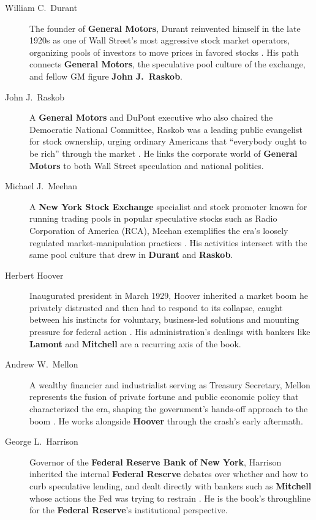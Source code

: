 \documentclass[11pt]{article}
\newcommand{\charname}[1]{\textbf{#1}}
\begin{document}
\begin{description}
\item[William C.\ Durant] The founder of \charname{General Motors}, Durant
reinvented himself in the late 1920s as one of Wall Street's most aggressive
stock market operators, organizing pools of investors to move prices in
favored stocks \autocite{supersummary1929}. His path connects
\charname{General Motors}, the speculative pool culture of the exchange, and
fellow GM figure \charname{John J.\ Raskob}.

\item[John J.\ Raskob] A \charname{General Motors} and DuPont executive who
also chaired the Democratic National Committee, Raskob was a leading public
evangelist for stock ownership, urging ordinary Americans that ``everybody
ought to be rich'' through the market \autocite{supersummary1929,
littlerbooks1929}. He links the corporate world of \charname{General Motors}
to both Wall Street speculation and national politics.

\item[Michael J.\ Meehan] A \charname{New York Stock Exchange} specialist and
stock promoter known for running trading pools in popular speculative stocks
such as Radio Corporation of America (RCA), Meehan exemplifies the era's
loosely regulated market-manipulation practices \autocite{supersummary1929}.
His activities intersect with the same pool culture that drew in
\charname{Durant} and \charname{Raskob}.

\item[Herbert Hoover] Inaugurated president in March 1929, Hoover inherited a
market boom he privately distrusted and then had to respond to its collapse,
caught between his instincts for voluntary, business-led solutions and mounting
pressure for federal action \autocite{supersummary1929,csmonitor1929}. His
administration's dealings with bankers like \charname{Lamont} and
\charname{Mitchell} are a recurring axis of the book.

\item[Andrew W.\ Mellon] A wealthy financier and industrialist serving as
Treasury Secretary, Mellon represents the fusion of private fortune and public
economic policy that characterized the era, shaping the government's hands-off
approach to the boom \autocite{supersummary1929}. He works alongside
\charname{Hoover} through the crash's early aftermath.

\item[George L.\ Harrison] Governor of the \charname{Federal Reserve Bank of
New York}, Harrison inherited the internal \charname{Federal Reserve} debates
over whether and how to curb speculative lending, and dealt directly with
bankers such as \charname{Mitchell} whose actions the Fed was trying to
restrain \autocite{supersummary1929}. He is the book's throughline for the
\charname{Federal Reserve}'s institutional perspective.


\end{description}
\end{document}

